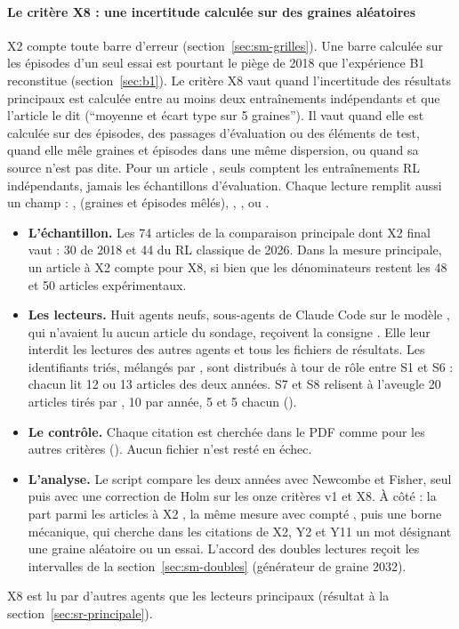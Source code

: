 \paragraph{Le critère X8 : une incertitude calculée sur des graines aléatoires}\label{sec:sm-x8}
X2 compte toute barre d'erreur (section~\ref{sec:sm-grilles}). Une barre calculée sur les épisodes
d'un seul essai est pourtant le piège de 2018 que l'expérience B1 reconstitue (section~\ref{sec:b1}).
Le critère X8 vaut  quand l'incertitude des résultats principaux est
calculée entre au moins deux entraînements indépendants et que l'article le dit (\enquote{moyenne et
écart type sur 5 graines}). Il vaut  quand elle est calculée sur des épisodes, des passages
d'évaluation ou des éléments de test, quand elle mêle graines et épisodes dans une même dispersion, ou
quand sa source n'est pas dite. Pour un article , seuls comptent les entraînements RL
indépendants, jamais les échantillons d'évaluation. Chaque lecture remplit aussi un champ
 : ,  (graines et épisodes mêlés), , ,
 ou .
\begin{itemize}
  \item \textbf{L'échantillon.} Les 74 articles de la comparaison principale dont X2 final vaut
   : 30 de 2018 et 44 du RL classique de 2026. Dans la mesure principale, un article à X2
   compte  pour X8, si bien que les dénominateurs restent les 48 et 50 articles
  expérimentaux.
  \item \textbf{Les lecteurs.} Huit agents neufs, sous-agents de Claude Code sur le modèle
  , qui n'avaient lu aucun article du sondage, reçoivent la consigne
  . Elle leur interdit les lectures des autres agents et tous les fichiers de
  résultats. Les identifiants triés, mélangés par , sont distribués à tour de
  rôle entre S1 et S6 : chacun lit 12 ou 13 articles des deux années. S7 et S8 relisent à l'aveugle 20
  articles tirés par , 10 par année, 5 et 5 chacun
  ().
  \item \textbf{Le contrôle.} Chaque citation est cherchée dans le PDF comme pour les autres critères
  (). Aucun fichier n'est resté en échec.
  \item \textbf{L'analyse.} Le script  compare les deux années avec Newcombe
  et Fisher, seul puis avec une correction de Holm sur les onze critères v1 et X8. À côté : la part
  parmi les articles à X2 , la même mesure avec  compté , puis une
  borne mécanique, qui cherche dans les citations de X2, Y2 et Y11 un mot désignant une graine aléatoire
  ou un essai. L'accord des doubles lectures reçoit les intervalles de la section~\ref{sec:sm-doubles}
  (générateur de graine 2032).
\end{itemize}
X8 est lu par d'autres agents que les lecteurs principaux (résultat à la
section~\ref{sec:sr-principale}).

